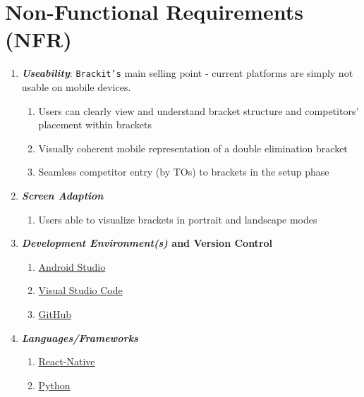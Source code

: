 \documentclass{article}
\begin{document}
\section*{Non-Functional Requirements (NFR)}
\begin{enumerate}
\item \textbf{\textit{Useability}}: \texttt{Brackit's} main selling point - current platforms are simply not usable on mobile devices. 
    \begin{enumerate}[label*=\arabic*.]
    \item{Users can clearly view and understand bracket structure and competitors’ placement within brackets}
    \item{Visually coherent mobile representation of a double elimination bracket}
    \item{Seamless competitor entry (by TOs) to brackets in the setup phase}
    \end{enumerate}

\item \textbf{\textit{Screen Adaption}}
    \begin{enumerate}[label*=\arabic*.]
    \item{Users able to visualize brackets in portrait and landscape modes}
    \end{enumerate}

\item \textbf{\textit{Development Environment(s)} and Version Control}
    \begin{enumerate}[label*=\arabic*.]
        \item{\href{https://developer.android.com/studio}{Android Studio}}
        \item{\href{https://code.visualstudio.com/}{Visual Studio Code}}

        \item{\href{https://github.com/}{GitHub}}
    \end{enumerate}    

\item \textbf{\textit{Languages/Frameworks}}
    \begin{enumerate}[label*=\arabic*.]
        \item{\href{https://facebook.github.io/react-native/}{React-Native}}
        \item{\href{https://www.python.org/}{Python}}
    \end{enumerate}


\end{enumerate}
\end{document}
